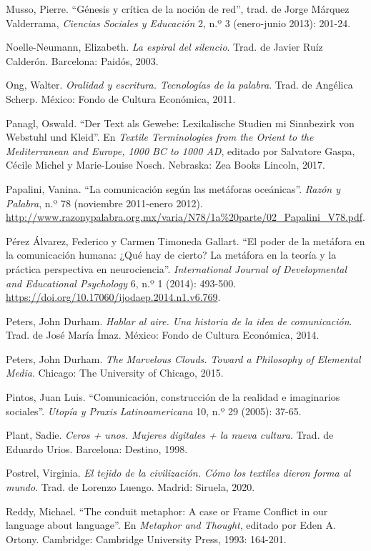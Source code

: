 \documentclass{tufte-handout}
\begin{document}
\begin{hangparas}{.25in}{1}
Musso, Pierre. ``Génesis y crítica de la noción de red'', trad. de Jorge
Márquez Valderrama, \emph{Ciencias Sociales y Educación} 2, n.º 3
(enero-junio 2013): 201-24.

Noelle-Neumann, Elizabeth. \emph{La espiral del silencio}. Trad. de
Javier Ruíz Calderón. Barcelona: Paidós, 2003.

Ong, Walter. \emph{Oralidad y escritura. Tecnologías de la palabra}.
Trad. de Angélica Scherp. México: Fondo de Cultura Económica, 2011.

Panagl, Oswald. ``Der Text als Gewebe: Lexikalische Studien mi
Sinnbezirk von Webstuhl und Kleid''. En \emph{Textile Terminologies from
the Orient to the Mediterranean and Europe, 1000 BC to 1000 AD}, editado
por Salvatore Gaspa, Cécile Michel y Marie-Louise Nosch. Nebraska: Zea
Books Lincoln, 2017.

Papalini, Vanina. ``La comunicación según las metáforas oceánicas''.
\emph{Razón y Palabra}, n.º 78 (noviembre 2011-enero 2012).
\url{http://www.razonypalabra.org.mx/varia/N78/1a\%20parte/02_Papalini_V78.pdf}.

Pérez Álvarez, Federico y Carmen Timoneda Gallart. ``El poder de la
metáfora en la comunicación humana: ¿Qué hay de cierto? La metáfora en
la teoría y la práctica perspectiva en neurociencia''.
\emph{International Journal of Developmental and Educational Psychology}
6, n.º 1 (2014): 493-500.
\url{https://doi.org/10.17060/ijodaep.2014.n1.v6.769}.

Peters, John Durham. \emph{Hablar al aire. Una historia de la idea de
comunicación}. Trad. de José María Ímaz. México: Fondo de Cultura
Económica, 2014.

Peters, John Durham. \emph{The Marvelous Clouds. Toward a Philosophy of
Elemental Media}. Chicago: The University of Chicago, 2015.

Pintos, Juan Luis. ``Comunicación, construcción de la realidad e
imaginarios sociales''. \emph{Utopía y Praxis Latinoamericana} 10, n.º
29 (2005): 37-65.

Plant, Sadie. \emph{Ceros + unos. Mujeres digitales + la nueva cultura}.
Trad. de Eduardo Urios. Barcelona: Destino, 1998.

Postrel, Virginia. \emph{El tejido de la civilización. Cómo los textiles
dieron forma al mundo}. Trad. de Lorenzo Luengo. Madrid: Siruela, 2020.

Reddy, Michael. ``The conduit metaphor: A case or Frame Conflict in our
language about language''. En \emph{Metaphor and Thought}, editado por
Eden A. Ortony. Cambridge: Cambridge University Press, 1993: 164-201.


\end{hangparas}
\end{document}
